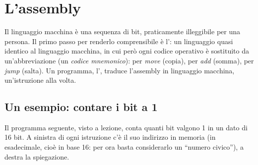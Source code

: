 \section{L'assembly}

Il linguaggio macchina è una sequenza di bit, praticamente illeggibile per
una persona. Il primo passo per renderlo comprensibile è l':
un linguaggio quasi identico al linguaggio macchina, in cui però ogni codice
operativo è sostituito da un'abbreviazione (un \textit{codice mnemonico}):
 per \textit{move} (copia),  per \textit{add} (somma),
 per \textit{jump} (salta). Un programma, l',
traduce l'assembly in linguaggio macchina, un'istruzione alla volta.

\subsection{Un esempio: contare i bit a 1}

Il programma seguente, visto a lezione, conta quanti bit valgono 1 in un
dato di 16 bit. A sinistra di ogni istruzione c'è il suo indirizzo in
memoria (in esadecimale, cioè in base 16: per ora basta considerarlo un
“numero civico”), a destra la spiegazione.

